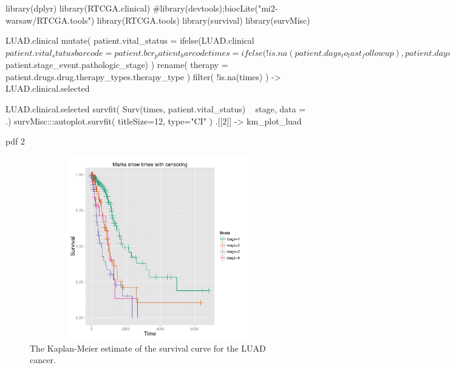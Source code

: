 \begin{Schunk}
\begin{Sinput}
library(dplyr)
library(RTCGA.clinical)
#library(devtools);biocLite("mi2-warsaw/RTCGA.tools") 
library(RTCGA.tools)
library(survival)
library(survMisc)

LUAD.clinical %
   mutate(
      patient.vital_status = ifelse(LUAD.clinical$patient.vital_status %
      barcode = patient.bcr_patient_barcode %
      times = ifelse( !is.na(patient.days_to_last_followup),
                 patient.days_to_last_followup %
                 patient.days_to_death %
      stage = RTCGA.tools::mergeStages(LUAD.clinical$patient.stage_event.pathologic_stage)
   ) %
   rename(
      therapy = patient.drugs.drug.therapy_types.therapy_type
   ) %
   filter( !is.na(times) ) -> LUAD.clinical.selected 

LUAD.clinical.selected %
   survfit( Surv(times, patient.vital_status) ~ stage, data = .) %
   survMisc:::autoplot.survfit( titleSize=12, type="CI" ) %
   .[[2]] -> km_plot_luad
\end{Sinput}
\end{Schunk}

\begin{Schunk}
\begin{Soutput}
pdf 
  2 
\end{Soutput}
\end{Schunk}

\begin{figure}[h!]
\begin{centering}
\includegraphics[width=12cm, height=8cm]{km_plot_luad.pdf}
\caption{\label{km_plot}The Kaplan-Meier estimate of the survival curve for the LUAD cancer. }
\end{centering}
\end{figure}

